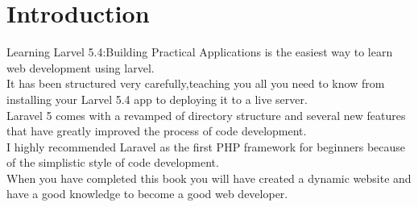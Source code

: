 \chapter{Introduction}
Learning Larvel 5.4:Building Practical Applications is the easiest way to learn web development using larvel.\\
It has been structured very carefully,teaching you all you need to know from installing your Larvel 5.4 app to deploying it to a live server.\\
Laravel 5 comes with a revamped of directory structure and several new features that have greatly improved the process of code development.\\
I highly recommended Laravel as the first PHP framework for beginners because of the simplistic style of code development.\\
When you have completed this book you will have created a dynamic website and have a good knowledge to become a good web developer.\\
  